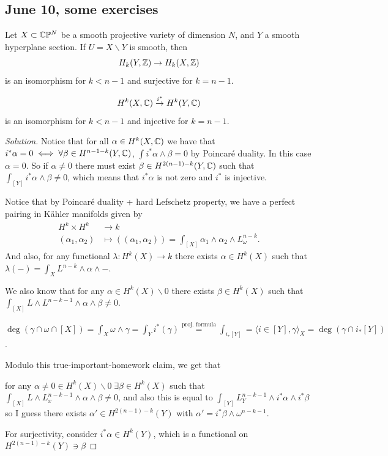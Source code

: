 \subsection{June 10, some exercises}\label{ssec:June 10, some exercises}

\begin{exercise}
	Let $X\subset \mathbb{C}\mathbb{P}^N$ be a smooth projective variety of dimension $N$, and $Y$ a smooth hyperplane section. If $U=X\backslash Y$ is smooth, then
	\[H_k(Y,\mathbb{Z})\to H_k(X,\mathbb{Z})\]
	is an isomorphism for $k<n-1$ and surjective for $k=n-1$.
\end{exercise}
\begin{exercise}
	\[H^k(X,\mathbb{C})\overset{i^*}{\to}H^k(Y,\mathbb{C})\]
	is an isomorphism for $k<n-1$ and injective for  $k=n-1$.
\end{exercise}
\begin{proof}[Solution]
	Notice that for all $\alpha\in H^k(X,\mathbb{C})$ we have that $i^*\alpha=0\iff\forall\beta\in H^{n-1-k}(Y,\mathbb{C})$, $\int i^*\alpha\wedge\beta=0$ by Poincar\'e duality. In this case $\alpha=0$. So if  $\alpha\neq 0$ there must exist $\beta\in H^{2(n-1)-k}(Y,\mathbb{C})$ such that $\int_{[Y]}i^*\alpha\wedge\beta\neq 0$, which means that $i^*\alpha$ is not zero and $i^*$ is injective.

	Notice that by Poincar\'e duality + hard Lefschetz property, we have a perfect pairing in K\"ahler manifolds given by
	\begin{align*}
		 H^k\times H^k &\longrightarrow k \\
		 (\alpha_1,\alpha_2) &\longmapsto ( (\alpha_1,\alpha_2)) = \int_{[X]}\alpha_1\wedge\alpha_2\wedge L^{n-k}_\omega
	.\end{align*}
	And also, for any functional $\lambda:H^k(X)\to k$ there exists $\alpha\in H^k(X)$ such that $\lambda(-)=\int_XL^{n-k}\wedge\alpha\wedge-$.

	We also know that for any $\alpha\in H^k(X)\backslash 0$ there exists $\beta\in H^k(X)$ such that $\int_{[X]}L\wedge L^{n-k-1}\wedge\alpha\wedge\beta\neq 0$.
	\begin{claim}
		$\deg(\gamma\cap\omega\cap[X])=\int_X\omega\wedge\gamma=\int_Yi^*(\gamma)\overset{\text{proj. formula}}{=}\int_{i_*[Y]}=\langle i\in[Y],\gamma\rangle_X=\deg(\gamma\cap i_*[Y])$.	
	\end{claim}

Modulo this true-important-homework claim, we get that

for any $\alpha\neq 0\in H^k(X)\backslash 0\;\exists \beta\in H^k(X)$ such that $\int_{[X]}L\wedge L_x^{n-k-1}\wedge\alpha\wedge\beta\neq 0$, and also this is equal to $\int_{[Y]}L_Y^{n-k-1}\wedge i^*\alpha\wedge i^*\beta$ so I guess there exists $\alpha'\in H^{2(n-1)-k}(Y)$ with $\alpha'=i^*\beta\wedge\omega^{n-k-1}$.

For surjectivity, consider $i^*\alpha\in H^k(Y)$, which is a functional on $H^{2(n-1)-k}(Y)\ni\beta$
\end{proof}

